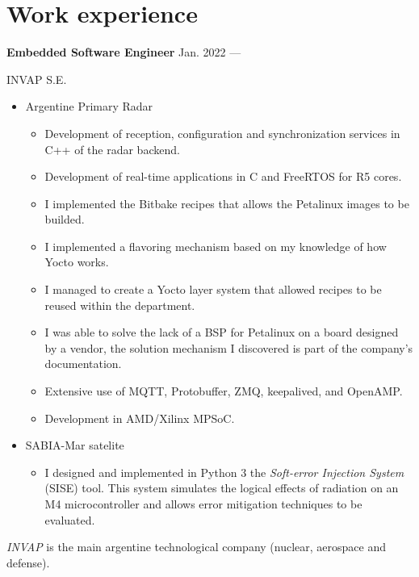 \section{Work experience}


\parbox[t][][t]{\linewidth}{
	\parbox{\linewidth}{
		\textbf{Embedded Software Engineer}
			\hfill
			{Jan. 2022 --- \phantom{Dec. 2099}}
		}
	\smallbreak
	\parbox{\linewidth}{INVAP S.E.}
	\smallbreak
	\begin{itemize}
		\item{Argentine Primary Radar}
		\begin{itemize}
			\item{Development of reception, configuration and synchronization services in C++ of the radar backend.}
			\item{Development of real-time applications in C and FreeRTOS for R5 cores.}
			\item{I implemented the Bitbake recipes that allows the Petalinux images to be builded.}
			\item{I implemented a flavoring mechanism based on my knowledge of how Yocto works.}
			\item{I managed to create a Yocto layer system that allowed recipes to be reused within the department.}
			\item{I was able to solve the lack of a BSP for Petalinux on a board designed by a vendor, the solution mechanism I discovered is part of the company's documentation.}
			\item{Extensive use of MQTT, Protobuffer, ZMQ, keepalived, and OpenAMP.}
			\item{Development in AMD/Xilinx MPSoC.}
		\end{itemize}
		\item{SABIA-Mar satelite}
		\begin{itemize}
			\item{I designed and implemented in Python 3 the \emph{Soft-error Injection System} (SISE) tool. This system simulates the logical effects of radiation on an M4 microcontroller and allows error mitigation techniques to be evaluated.}
		\end{itemize}
	\end{itemize}
	\smallbreak
    \emph{INVAP} is the main argentine technological company (nuclear, aerospace and defense).
}

